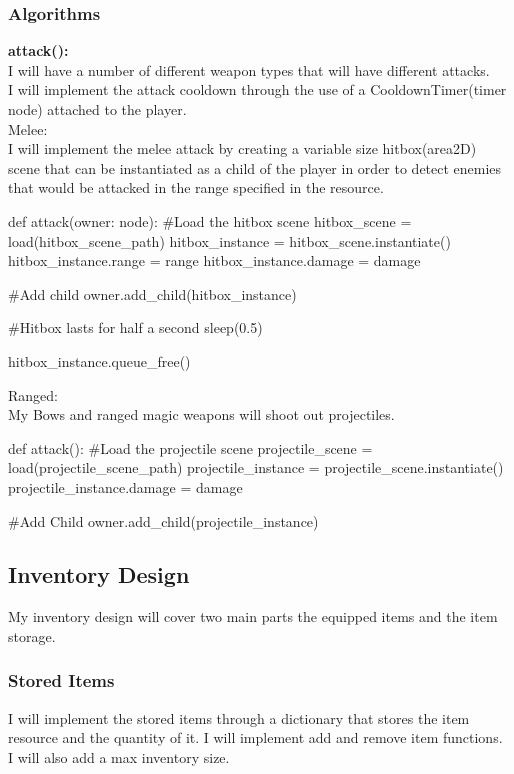 \documentclass{article}
\begin{document}
        \subsubsection{Algorithms}
        \textbf{attack():}\\
        I will have a number of different weapon types that will have different attacks.\\
        I will implement the attack cooldown through the use of a CooldownTimer(timer node) attached to the player.\\
        Melee:\\
        I will implement the melee attack by creating a variable size hitbox(area2D) scene that can be instantiated as a child of the player in order to detect enemies that would be attacked in the range specified in the resource.\\
        \begin{python}
def attack(owner: node):
   #Load the hitbox scene
   hitbox_scene = load(hitbox_scene_path)
   hitbox_instance = hitbox_scene.instantiate()
   hitbox_instance.range = range
   hitbox_instance.damage = damage

   #Add child
   owner.add_child(hitbox_instance)

   #Hitbox lasts for half a second
   sleep(0.5)
   
   hitbox_instance.queue_free()

        \end{python}
        Ranged:\\
        My Bows and ranged magic weapons will shoot out projectiles.
        \begin{python}
def attack():
   #Load the projectile scene
   projectile_scene = load(projectile_scene_path)
   projectile_instance = projectile_scene.instantiate()
   projectile_instance.damage = damage

   #Add Child
   owner.add_child(projectile_instance)
        \end{python}
        \subsection{Inventory Design}
        My inventory design will cover two main parts the equipped items and the item storage.\\
        \subsubsection{Stored Items}
        I will implement the stored items through a dictionary that stores the item resource and the quantity of it. I will implement add and remove item functions. I will also add a max inventory size.\\
\end{document}
